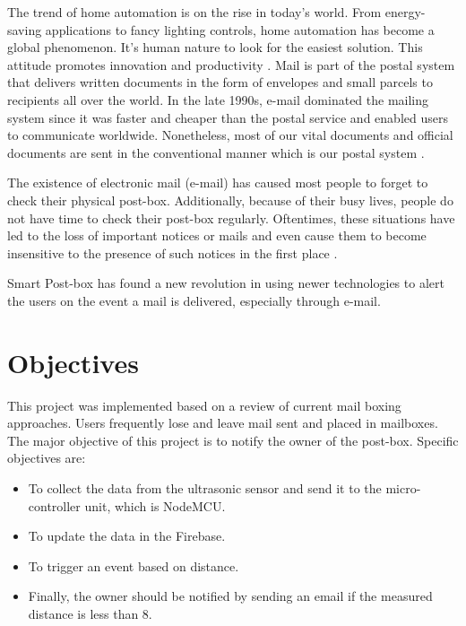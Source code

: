 \label{chapter:introduction}

The trend of home automation is on the rise in today's world. From energy-saving applications to fancy lighting controls, home automation has become a global phenomenon. It's human nature to look for the easiest solution. This attitude promotes innovation and productivity \cite{hassan_2018}. Mail is part of the postal system that delivers written documents in the form of envelopes and small parcels to recipients all over the world. In the late 1990s, e-mail dominated the mailing system since it was faster and cheaper than the postal service and enabled users to communicate worldwide. Nonetheless, most of our vital documents and official documents are sent in the conventional manner which is our postal system \cite{Subramaniam2007}.

The existence of electronic mail (e-mail) has caused most people to forget to check their physical post-box. Additionally, because of their busy lives, people do not have time to check their post-box regularly. Oftentimes, these situations have led to the loss of important notices or mails and even cause them to become insensitive to the presence of such notices in the first place \cite{Muhamaad_2019}.

Smart Post-box has found a new revolution in using newer technologies to alert the users on the event a mail is delivered, especially through e-mail.

\section{Objectives}
This project was implemented based on a review of current mail boxing approaches.
Users frequently lose and leave mail sent and placed in mailboxes. The major objective of this project is to notify the owner of the post-box. Specific objectives are: 

\begin{itemize}
  \item To collect the data from the ultrasonic sensor and send it to the micro-controller unit, which is NodeMCU.
  \item To update the data in the Firebase.
  \item To trigger an event based on distance.
  \item Finally, the owner should be notified by sending an email if the measured distance is less than 8.
\end{itemize}